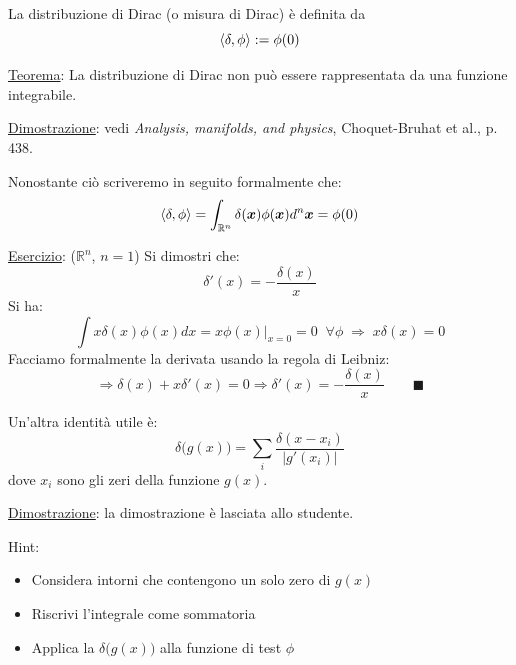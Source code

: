 \documentclass[a4paper,11pt]{report}
\newcommand{\Rn}{\mathbb{R}^n}
\newcommand{\x}{\boldsymbol{x}}
\begin{document}
La distribuzione di Dirac (o misura di Dirac) \`e definita da 
\begin{equation}
\Braket{\delta,\phi} := \phi(0) 
\end{equation}

\underline{Teorema}: La distribuzione di Dirac non pu\`o essere rappresentata da una funzione integrabile. 

\underline{Dimostrazione}: vedi \emph{Analysis, manifolds, and physics}, Choquet-Bruhat et al., p. 438. 

\medskip

Nonostante ci\`o scriveremo in seguito formalmente che:
\begin{equation}
\Braket{\delta , \phi} = \int_{\Rn} \delta (\x) \phi(\x) d^n \x= \phi(0) 
\end{equation}

\underline{Esercizio}: ($ \mathbb{R}^n$, $n=1$) Si dimostri che:
\begin{equation}
\delta' (x) =-\frac{\delta(x)}{x}
\end{equation}
Si ha:
\[
\int x\delta(x)\phi(x)dx = x\phi(x)\Big|_{x=0}=0 \;\; \forall \phi \; \Rightarrow \; x\delta(x)=0
\]
Facciamo formalmente la derivata usando la regola di Leibniz:
\[
\Rightarrow \delta(x) + x\delta'(x)=0 \Rightarrow \delta ' (x) = -\frac{\delta(x)}{x}  \qquad \blacksquare
\]

Un'altra identit\`a utile \`e:
\begin{equation}
\delta\big(g(x)\big) = \sum_{i}\frac{\delta(x-x_i)}{|g'(x_i)|} 
\end{equation} 
dove $x_i$ sono gli zeri della funzione $g(x)$.

\underline{Dimostrazione}: la dimostrazione \`e lasciata allo studente.

Hint:
\begin{itemize}
\item Considera intorni che contengono un solo zero di $g(x)$
\item Riscrivi l'integrale come sommatoria
\item Applica la $\delta\big(g(x)\big)$ alla funzione di test $\phi$
\end{itemize}

\medskip
\end{document}
